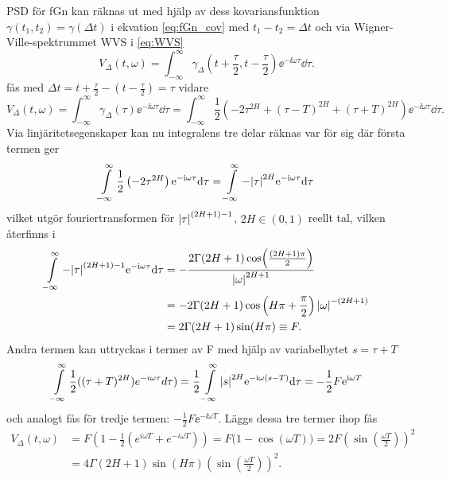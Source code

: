 PSD för fGn kan räknas ut med hjälp av dess kovariansfunktion $\gamma(t_1,t_2)=\gamma(\Delta{t})$ i ekvation \eqref{eq:fGn_cov} med $t_1-t_2=\Delta{t}$ och via Wigner-Ville-spektrummet WVS i \eqref{eq:WVS}
\begin{equation}
    V_{\Delta}(t,\omega)
    =\int^{\infty}_{-\infty} 
    \gamma_{\Delta}
    \left(
    t+\frac{\tau}{2},t-\frac{\tau}{2}
    \right) 
    \ee^{-\ii\omega\tau} \dd\tau.
\end{equation}
fås med $\Delta{t}=t+\frac{\tau}{2}-(t-\frac{\tau}{2})=\tau$ vidare
\begin{equation} \label{eq:fGn_covterm}
    V_{\Delta}(t, \omega)
    =
    \int^{\infty}_{-\infty} 
    \gamma_{\Delta}(\tau) \ee^{-\ii\omega\tau} \dd\tau 
    = 
    \int^{\infty}_{-\infty} \frac{1}{2} 
    \left(
    -2\tau^{2H} + (\tau-T)^{2H} + (\tau+T)^{2H}
    \right) 
    \ee^{-\ii\omega\tau} \dd\tau.
\end{equation}
Via linjäritetsegenskaper kan nu integralens tre delar räknas var för sig där första termen ger
\begin{equation}
    \int^{\infty}_{-\infty}
    \frac{1}{2}\left(-2\tau^{2H}\right)
    \ee^{-\ii\omega\tau} \dd\tau 
    = \int^{\infty}_{-\infty} -\abs{\tau}^{2H}\ee^{-\ii\omega\tau} \dd\tau 
\end{equation}
vilket utgör fouriertransformen för $\abs{\tau}^{(2H+1)-1}$, $2H\in (0,1)$ reellt tal, vilken återfinns i \cite{BETA}
\begin{equation}
\begin{aligned}
    \int^{\infty}_{-\infty} -\abs{\tau}^{(2H+1)-1}\ee^{-\ii\omega\tau} \dd\tau 
    &= -\frac{
    2\Gamma(2H+1)
    \cos(\frac{(2H+1)\pi}{2})}{
    \abs{\omega}^{2H+1}} 
    \\ 
    &= -2\Gamma{(2H+1)} \cos\left(H\pi+\frac{\pi}{2}\right) \abs{\omega}^{-(2H+1)} 
    \\
    &= 2\Gamma{(2H+1)}\sin(H\pi) \equiv F.
\end{aligned}
\end{equation}
Andra termen kan uttryckas i termer av F med hjälp av variabelbytet $s=\tau+T$
\begin{equation}
    \int^{\infty}_{-\infty}\frac{1}{2}((\tau+T)^{2H})e^{-i\omega\tau} d\tau) = \frac{1}{2}\int^{\infty}_{-\infty} \abs{s}^{2H} \ee^{-\ii\omega(s-T)} \dd\tau = -\frac{1}{2} F \ee^{\ii\omega T} 
\end{equation}
och analogt fås för tredje termen: $-\frac{1}{2} F \ee^{-\ii\omega T}$. Läggs dessa tre termer ihop fås
\begin{equation}
\begin{aligned}
    V_{\Delta}(t,\omega)
    &= F\left(1-\frac{1}{2}(e^{i\omega T}+e^{-i\omega T})\right) 
    = F\Big( 1-\cos(\omega T) \Big) 
    = 2F\left(\sin(\frac{\omega T}{2})\right)^2 \\
    &= 
    4\Gamma{(2H+1)}
    \sin(H\pi)\left(\sin(\frac{\omega T}{2})\right)^2. \label{eq:fGn_PSD_halvklar}
\end{aligned}
\end{equation}
